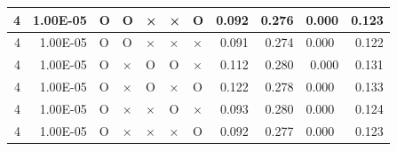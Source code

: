 \documentclass[11pt]{article}
\begin{document}
\begin{longtable}[h]{|r|r|l|l|l|l|l|r|r|l|r|}
4                                 & 1.00E-05                         & O                                & O                                & ×                                & ×                                & O                                 & 0.092                             & 0.276                             & 0.000                              & 0.123                               \\ \hline
4                                 & 1.00E-05                         & O                                & O                                & ×                                & ×                                & ×                                 & 0.091                             & 0.274                             & 0.000                              & 0.122                               \\ \hline
4                                 & 1.00E-05                         & O                                & ×                                & O                                & O                                & ×                                 & 0.112                             & 0.280                             & \multicolumn{1}{r|}{0.000}         & 0.131                               \\ \hline
4                                 & 1.00E-05                         & O                                & ×                                & O                                & ×                                & O                                 & 0.122                             & 0.278                             & 0.000                              & 0.133                               \\ \hline
4                                 & 1.00E-05                         & O                                & ×                                & ×                                & O                                & ×                                 & 0.093                             & 0.280                             & 0.000                              & 0.124                               \\ \hline
4                                 & 1.00E-05                         & O                                & ×                                & ×                                & ×                                & O                                 & 0.092                             & 0.277                             & 0.000                              & 0.123                               \\ \hline

\end{longtable}
\end{document}

